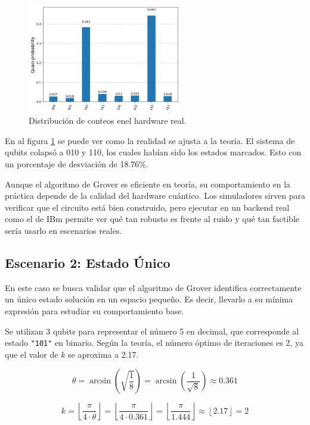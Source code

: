 \documentclass{article}
\begin{document}
\begin{figure}[H]
    \centering
    \includegraphics[width=0.6\textwidth]{hist1.png}
    \caption{Distribución de conteos enel hardware real.}
    \label{fig:grover_histogram}
\end{figure}

En al figura \ref{fig:grover_histogram} se puede ver como
la realidad se ajusta a la teoría. El sistema de qubits colapsó 
a 010 y 110, los cuales habían sido los estados
marcados. Esto con un porcentaje de desviación de 18.76\%.

Aunque el algoritmo de Grover es eficiente en teoría, su comportamiento en la 
práctica depende de la calidad del hardware cuántico. Los simuladores sirven 
para verificar que el circuito está bien construido, pero ejecutar en un backend 
real como el de IBm permite ver qué tan robusto es frente al ruido y qué tan 
factible sería usarlo 
en escenarios reales.


\subsection{Escenario 2: Estado Único}

En este caso se busca validar que el algoritmo de Grover identifica correctamente 
un único estado solución en un espacio pequeño. Es decir, llevarlo a su mínima 
expresión para estudiar su comportamiento base.

Se utilizan 3 qubits para representar el número 5 en decimal, que corresponde al 
estado \texttt{"101"} en binario. Según la teoría, el número óptimo de iteraciones 
es 2, ya que el valor de \( k \) se aproxima a 2.17.

\[
\theta = \arcsin\left( \sqrt{\frac{1}{8}} \right) = \arcsin\left( \frac{1}{\sqrt{8}} \right) \approx 0.361
\]

\[
k = \left\lfloor \frac{\pi}{4 \cdot \theta} \right\rfloor = \left\lfloor \frac{\pi}{4 \cdot 0.361} \right\rfloor = \left\lfloor \frac{\pi}{1.444} \right\rfloor \approx \left\lfloor 2.17 \right\rfloor = 2
\]
\end{document}
